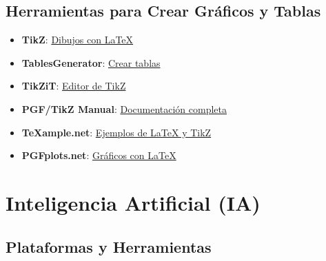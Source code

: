 \documentclass[
  jou,
  floatsintext,
  longtable,
  a4paper,
  nolmodern,
  notxfonts,
  notimes,
  colorlinks=true,linkcolor=blue,citecolor=blue,urlcolor=blue]{apa7}
\providecommand{\tightlist}{%
  \setlength{\itemsep}{0pt}\setlength{\parskip}{0pt}}
\begin{document}
\subsection{Herramientas para Crear Gráficos y
Tablas}\label{herramientas-para-crear-gruxe1ficos-y-tablas}

\begin{itemize}
\tightlist
\item
  \textbf{TikZ}: \href{https://tikz.org/}{Dibujos con LaTeX}
\item
  \textbf{TablesGenerator}:
  \href{https://www.tablesgenerator.com/}{Crear tablas}
\item
  \textbf{TikZiT}: \href{https://tikzit.github.io/}{Editor de TikZ}
\item
  \textbf{PGF/TikZ Manual}: \href{https://tikz.dev/}{Documentación
  completa}
\item
  \textbf{TeXample.net}: \href{https://texample.net/}{Ejemplos de LaTeX
  y TikZ}
\item
  \textbf{PGFplots.net}: \href{https://pgfplots.net/}{Gráficos con
  LaTeX}
\end{itemize}

\section{Inteligencia Artificial (IA)}\label{inteligencia-artificial-ia}

\subsection{Plataformas y
Herramientas}\label{plataformas-y-herramientas}
\end{document}
